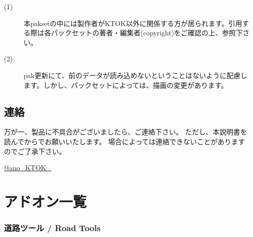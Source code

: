 \documentclass{jarticle}
\begin{document}
\begin{description}
  \item[(1)]
    本paksetの中には製作者がKTOK以外に関係する方が居られます。引用する際は各パックセットの著者・編集者(copyright)をご確認の上、参照下さい。
  \item[(2)]
    pak更新にて、前のデータが読み込めないということはないように配慮します。しかし、パックセットによっては、描画の変更があります。
\end{description}

\subsection*{連絡}
万が一、製品に不具合がございましたら、ご連絡下さい。 ただし、本説明書を読んでからでお願いいたします。 場合によっては連絡できないことがありますのでご了承下さい。

\href{https://twitter.com/ano_KTOK_}{@ano\_KTOK\_}

\newpage

\section{アドオン一覧}



\subsubsection*{道路ツール / Road Tools}
\end{document}
